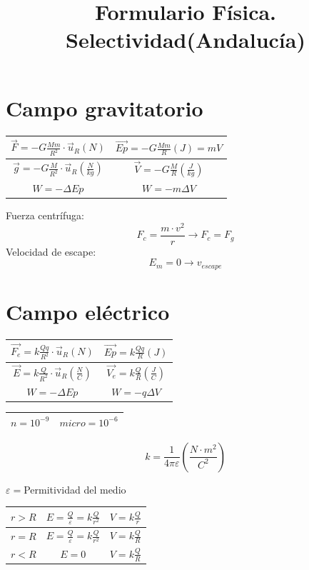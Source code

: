 \documentclass{article}
\title{\vspace{-100pt} \Huge Formulario Física. Selectividad(Andalucía)}
\author{}
\date{}
\begin{document}
\centering

\begin{multicols}{2}[] 

\section{Campo gravitatorio}

\begin{center}
  \begin{tabular}{|c|c|}
      \hline
      $\vec{F}=-G\frac{Mm}{R^2}\cdot\vec{u}_R(N)$ & $\vec{Ep}=-G\frac{Mm}{R}(J)=mV$ \\
      \hline
      $\vec{g}=-G\frac{M}{R^2}\cdot\vec{u}_R(\frac{N}{kg})$ & $\vec{V}=-G\frac{M}{R}(\frac{J}{kg})$ \\
      \hline
      $W=-\Delta Ep$ & $W=-m\Delta V$ \\
      \hline
   \end{tabular}
\end{center}


Fuerza centrífuga:
\[F_c=\frac{m\cdot v^2}{r} \rightarrow F_c=F_g\]
Velocidad de escape: 
\[E_m=0 \rightarrow v_{escape}\]

\section{Campo eléctrico}

\begin{center}
  \begin{tabular}{|c|c|}
      \hline
      $\vec{F_e}=k\frac{Qq}{R^2}\cdot\vec{u}_R(N)$ & $\vec{Ep}=k\frac{Qq}{R}(J)$ \\
      \hline
      $\vec{E}=k\frac{Q}{R^2}\cdot\vec{u}_R(\frac{N}{C})$ & $\vec{V_e}=k\frac{Q}{R}(\frac{J}{C})$ \\
      \hline
      $W=-\Delta Ep$ & $W=-q\Delta V$ \\
      \hline
   \end{tabular} 

   \begin{tabular}{|c|c|}
    \hline
    $n = 10^{-9}$ & $micro=10^{-6}$\\
    \hline    
 \end{tabular}
\end{center}

\[k=\frac{1}{4\pi\varepsilon} \left(\frac{N\cdot m^2}{C^2} \right)\]

$\varepsilon=$Permitividad del medio

\begin{center}
  \begin{tabular}{|c|c|c|}
      \hline
      $r>R$ & $E=\frac{Q}{\varepsilon}=k\frac{Q}{r^2}$ & $V=k\frac{Q}{r}$\\
      \hline
      $r=R$ & $E=\frac{Q}{\varepsilon}=k\frac{Q}{r^2}$ & $V=k\frac{Q}{R}$\\
      \hline
      $r<R$ & $E=0$ & $V=k\frac{Q}{R}$\\
      \hline
 \end{tabular}
\end{center}


\end{multicols}
\end{document}
